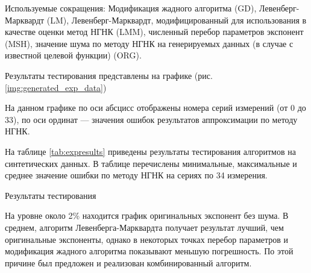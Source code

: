 \clearpage



Используемые сокращения: Модификация жадного алгоритма (GD), Левенберг-Марквардт (LM), Левенберг-Марквардт, модифицированный для использования в качестве оценки метод НГНК (LMM), численный перебор параметров экспонент (MSH), значение шума по методу НГНК на генерируемых данных (в случае с известной целевой функции) (ORG). 

Результаты тестирования представлены на графике (рис. \ref{img:generated_exp_data})






На данном графике по оси абсцисс отображены номера серий измерений (от 0 до 33), по оси ординат --- значения ошибок результатов аппроксимации по методу НГНК.

На таблице \ref{tab:expresults} приведены результаты тестирования алгоритмов на синтетических данных. В таблице перечислены минимальные, максимальные и среднее значение ошибки по методу НГНК на сериях по 34 измерения. 



\begin{table}[h]
\centering
\caption{Результаты тестирования}
	  
\label{tab:expresults}
\end{table}



На уровне около 2\% находится график оригинальных экспонент без шума. В среднем, алгоритм Левенберга-Марквардта 
получает результат лучший, чем оригинальные экспоненты, однако в некоторых точках перебор параметров и модификация
 жадного алгоритма показывают меньшую погрешность. По этой причине был предложен и реализован комбинированный алгоритм.

